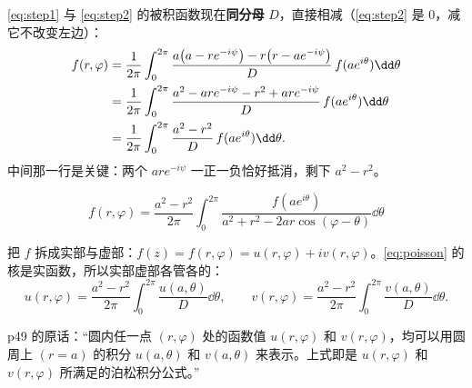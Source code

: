 
\eqref{eq:step1} 与 \eqref{eq:step2} 的被积函数现在\textbf{同分母} $D$，直接相减（\eqref{eq:step2} 是 $0$，减它不改变左边）：
\begin{align}
f(r,\varphi)&=\frac{1}{2\pi}\int_0^{2\pi}\frac{a\bigl(a-re^{-i\psi}\bigr)-r\bigl(r-ae^{-i\psi}\bigr)}{D}\,f(ae^{i\theta})\dd\theta\notag\\
&=\frac{1}{2\pi}\int_0^{2\pi}\frac{a^{2}-ar e^{-i\psi}-r^{2}+ar e^{-i\psi}}{D}\,f(ae^{i\theta})\dd\theta\notag\\
&=\frac{1}{2\pi}\int_0^{2\pi}\frac{a^{2}-r^{2}}{D}\,f(ae^{i\theta})\dd\theta .
\end{align}
中间那一行是关键：两个 $ar e^{-i\psi}$ 一正一负恰好抵消，剩下 $a^{2}-r^{2}$。

\begin{equation}\label{eq:poisson}
\boxed{\;f(r,\varphi)=\frac{a^{2}-r^{2}}{2\pi}\int_0^{2\pi}\frac{f(ae^{i\theta})}{a^{2}+r^{2}-2ar\cos(\varphi-\theta)}\dd\theta\;}
\end{equation}




把 $f$ 拆成实部与虚部：$f(z)=f(r,\varphi)=u(r,\varphi)+iv(r,\varphi)$。\eqref{eq:poisson} 的核是实函数，所以实部虚部各管各的：
\begin{equation}\label{eq:poissonuv}
u(r,\varphi)=\frac{a^{2}-r^{2}}{2\pi}\int_0^{2\pi}\frac{u(a,\theta)}{D}\dd\theta,
\qquad
v(r,\varphi)=\frac{a^{2}-r^{2}}{2\pi}\int_0^{2\pi}\frac{v(a,\theta)}{D}\dd\theta .
\end{equation}

p49 的原话：“圆内任一点 $(r,\varphi)$ 处的函数值 $u(r,\varphi)$ 和 $v(r,\varphi)$，均可以用圆周上 $(r=a)$ 的积分 $u(a,\theta)$ 和 $v(a,\theta)$ 来表示。上式即是 $u(r,\varphi)$ 和 $v(r,\varphi)$ 所满足的泊松积分公式。”


